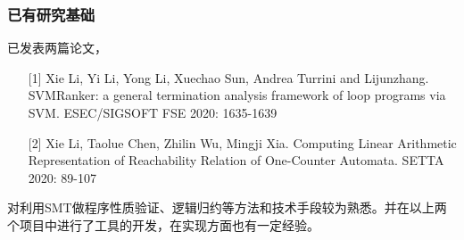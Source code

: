 \documentclass[aspectratio=1610, 11pt]{beamer}
\begin{document}
\begin{frame}\frametitle{已有研究基础}
已发表两篇论文，
\begin{itemize}
\item [{[1]}] Xie Li, Yi Li, Yong Li, Xuechao Sun, Andrea Turrini and Lijunzhang. SVMRanker: a general termination analysis framework of loop programs via SVM. ESEC/SIGSOFT FSE 2020: 1635-1639
\item [{[2]}] Xie Li, Taolue Chen, Zhilin Wu, Mingji Xia. Computing Linear Arithmetic Representation of Reachability Relation of One-Counter Automata. SETTA 2020: 89-107
\end{itemize}

对利用SMT做程序性质验证、逻辑归约等方法和技术手段较为熟悉。并在以上两个项目中进行了工具的开发，在实现方面也有一定经验。
\end{frame}
\end{document}
